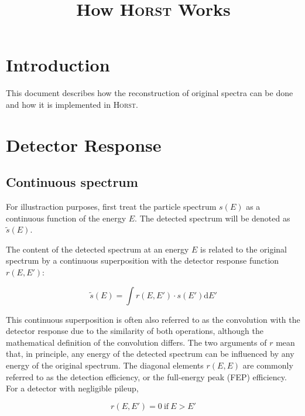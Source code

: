 \documentclass{article}
\begin{document}
\title{How \textsc{Horst} Works}
\date{}

\maketitle

\tableofcontents

\newpage

\section{Introduction}
This document describes how the reconstruction of original spectra can be done and how it is implemented in \textsc{Horst}.

\section{Detector Response}

\subsection{Continuous spectrum}
For illustraction purposes, first treat the particle spectrum $s(E)$ as a continuous function of the energy $E$. 
The detected spectrum will be denoted as $\tilde{s}(E)$.

\noindent The content of the detected spectrum at an energy $E$ is related to the original spectrum by a continuous superposition with the detector response function $r(E, E')$:

\begin{equation}
\label{convolution_continuous}
	\tilde{s}(E) = \int r(E, E') \cdot s(E') \mathrm{d}E' 
\end{equation}

\noindent This continuous superposition is often also referred to as the convolution with the detector response due to the similarity of both operations, although the mathematical definition of the convolution differs.
The two arguments of $r$ mean that, in principle, any energy of the detected spectrum can be influenced by any energy of the original spectrum.
The diagonal elements $r(E,E)$ are commonly referred to as the detection efficiency, or the full-energy peak (FEP) efficiency.
For a detector with negligible pileup, 

\begin{equation}
	\label{response_condition}
	r(E, E') = 0 ~\mathrm{if}~ E > E'
\end{equation}
\end{document}
